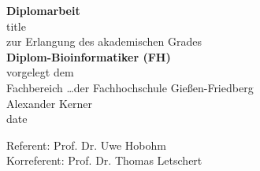 \begin{titlepage}
	\begin{center}
\LARGE \textbf{Diplomarbeit}
\\
\vspace{1.0cm}
\huge title
\\
\vspace{1.0cm}
\LARGE zur Erlangung des akademischen Grades
\\
\vspace{1.0cm}
\LARGE \textbf{Diplom-Bioinformatiker (FH)}
\\
\vspace{2.0cm} 
\normalsize vorgelegt dem
\\
\normalsize Fachbereich \ldots der Fachhochschule Gießen-Friedberg
\\
\vspace{1.0cm}
\normalsize Alexander Kerner
\\
\vspace{1.0cm}
\normalsize date
\end{center}
\vspace{3.0cm}
\normalsize Referent: Prof. Dr. Uwe Hobohm
\\
\normalsize Korreferent: Prof. Dr. Thomas Letschert
\end{titlepage}